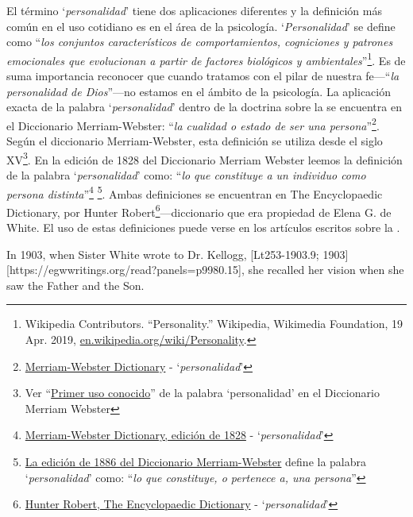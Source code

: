 El término ‘\textit{personalidad}’ tiene dos aplicaciones diferentes y la definición más común en el uso cotidiano es en el área de la psicología. ‘\textit{Personalidad}’ se define como “\textit{los conjuntos característicos de comportamientos, cogniciones y patrones emocionales que evolucionan a partir de factores biológicos y ambientales}”\footnote{Wikipedia Contributors. “Personality.” Wikipedia, Wikimedia Foundation, 19 Apr. 2019, \href{https://en.wikipedia.org/wiki/Personality}{en.wikipedia.org/wiki/Personality}.}. Es de suma importancia reconocer que cuando tratamos con el pilar de nuestra fe—“\textit{la personalidad de Dios}”—no estamos en el ámbito de la psicología. La aplicación exacta de la palabra ‘\textit{personalidad}’ dentro de la doctrina sobre la  se encuentra en el Diccionario Merriam-Webster: “\textit{la cualidad o estado de ser una persona}”\footnote{\href{https://www.merriam-webster.com/dictionary/personality}{Merriam-Webster Dictionary} - ‘\textit{personalidad}’}. Según el diccionario Merriam-Webster, esta definición se utiliza desde el siglo XV\footnote{Ver “\href{https://www.merriam-webster.com/dictionary/personality\#word-history}{Primer uso conocido}” de la palabra ‘personalidad’ en el Diccionario Merriam Webster}. En la edición de 1828 del Diccionario Merriam Webster leemos la definición de la palabra ‘\textit{personalidad}’ como: “\textit{lo que constituye a un individuo como persona distinta}”\footnote{\href{https://archive.org/details/americandictiona02websrich/page/272/mode/2up}{Merriam-Webster Dictionary, edición de 1828} - ‘\textit{personalidad}’} \footnote{\href{https://archive.org/details/websterscomplete00webs/page/974/mode/2up}{La edición de 1886 del Diccionario Merriam-Webster} define la palabra ‘\textit{personalidad}’ como: “\textit{lo que constituye, o pertenece a, una persona}”}. Ambas definiciones se encuentran en The Encyclopaedic Dictionary, por Hunter Robert\footnote{\href{https://babel.hathitrust.org/cgi/pt?id=mdp.39015050663213&view=1up&seq=780}{Hunter Robert, The Encyclopaedic Dictionary} - ‘\textit{personalidad}’}—diccionario que era propiedad de Elena G. de White. El uso de estas definiciones puede verse en los artículos escritos sobre la .


In 1903, when Sister White wrote to Dr. Kellogg, [Lt253-1903.9; 1903][https://egwwritings.org/read?panels=p9980.15], she recalled her vision when she saw the Father and the Son.


